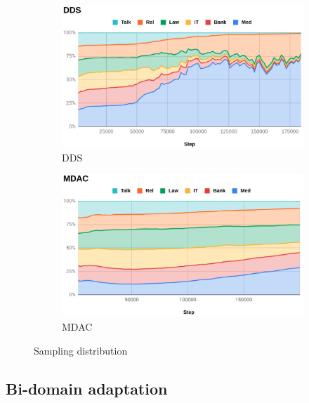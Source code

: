 \documentclass[11pt]{article}
\begin{document}
\begin{figure}[htbp]
\begin{subfigure}{.5\textwidth}
  \centering
  \includegraphics[width=.8\linewidth]{DDS.png}  
  \caption{DDS}
  \label{fig:DDS}
\end{subfigure}
\begin{subfigure}{.5\textwidth}
  \centering
  \includegraphics[width=.8\linewidth]{MDAC.png}  
  \caption{MDAC}
  \label{fig:MDAC}
\end{subfigure}
\caption{Sampling distribution}
\label{fig:sampling}
\end{figure}

\subsection{Bi-domain adaptation}
\end{document}
